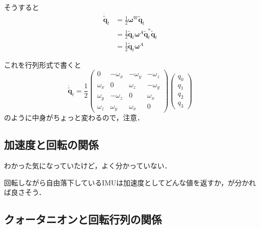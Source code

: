 そうすると
\begin{align}
  \dot{\tilde{\boldsymbol{q}}}_{t} &= \frac{1}{2} \boldsymbol{\omega}^{W} \tilde{\boldsymbol{q}}_{t}\\
  &= \frac{1}{2} \tilde{\boldsymbol{q}}_{t} \boldsymbol{\omega}^{A} \tilde{\boldsymbol{q}}^{\ast}_{t} \tilde{\boldsymbol{q}}_{t}\\
    &= \frac{1}{2} \tilde{\boldsymbol{q}}_{t} \boldsymbol{\omega}^{A}
\end{align}

これを行列形式で書くと
\begin{equation}
  \dot{\tilde{\boldsymbol{q}}}_{t} =
  \frac{1}{2}
  \begin{pmatrix}
    0        & -\omega_x & -\omega_y & -\omega_z\\
    \omega_x &         0 &  \omega_z & -\omega_y\\
    \omega_y & -\omega_z &         0 &  \omega_x\\
    \omega_z &  \omega_y &  \omega_x &         0
  \end{pmatrix}
  \begin{pmatrix}
    q_0\\
    q_1\\
    q_2\\
    q_3
  \end{pmatrix}
\end{equation}
のように中身がちょっと変わるので，注意．

\subsection{加速度と回転の関係}\label{subsec:acc}
わかった気になっていたけど，よく分かっていない．

回転しながら自由落下しているIMUは加速度としてどんな値を返すか，が分かれば良さそう．

\subsection{クォータニオンと回転行列の関係}\label{subsec:quat-dcm}

